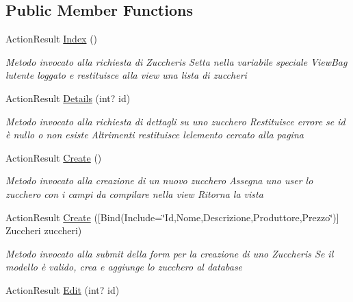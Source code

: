 \subsection*{Public Member Functions}
\begin{DoxyCompactItemize}
\item 
Action\+Result \mbox{\hyperlink{class_brew_day2_1_1_controllers_1_1_zuccheris_controller_ada1bf34b38c332323dd30dcf18643fb5}{Index}} ()
\begin{DoxyCompactList}\small\item\em Metodo invocato alla richiesta di Zuccheris Setta nella variabile speciale View\+Bag l\textquotesingle{}utente loggato e restituisce alla view una lista di zuccheri \end{DoxyCompactList}\item 
Action\+Result \mbox{\hyperlink{class_brew_day2_1_1_controllers_1_1_zuccheris_controller_aa0b63d9d1577350252de922e0041c4c9}{Details}} (int? id)
\begin{DoxyCompactList}\small\item\em Metodo invocato alla richiesta di dettagli su uno zucchero Restituisce errore se id è nullo o non esiste Altrimenti restituisce l\textquotesingle{}elemento cercato alla pagina \end{DoxyCompactList}\item 
Action\+Result \mbox{\hyperlink{class_brew_day2_1_1_controllers_1_1_zuccheris_controller_a47bd1b297f1aedb0d7e3b3a374b2ea33}{Create}} ()
\begin{DoxyCompactList}\small\item\em Metodo invocato alla creazione di un nuovo zucchero Assegna uno user lo zucchero con i campi da compilare nella view Ritorna la vista \end{DoxyCompactList}\item 
Action\+Result \mbox{\hyperlink{class_brew_day2_1_1_controllers_1_1_zuccheris_controller_a6af10a8e51185ce8f4cf938c545d10c2}{Create}} (\mbox{[}Bind(Include=\char`\"{}Id,Nome,Descrizione,Produttore,Prezzo\char`\"{})\mbox{]} Zuccheri zuccheri)
\begin{DoxyCompactList}\small\item\em Metodo invocato alla submit della form per la creazione di uno Zuccheris Se il modello è valido, crea e aggiunge lo zucchero al database \end{DoxyCompactList}\item 
Action\+Result \mbox{\hyperlink{class_brew_day2_1_1_controllers_1_1_zuccheris_controller_a65fd03bfe14dab909536be6441b7e5a8}{Edit}} (int? id)

\end{DoxyCompactItemize}
